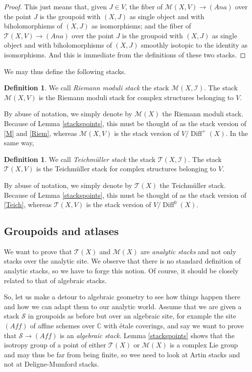 \documentclass[10pt]{amsart}
\let\mathcal\mathscr
\newcommand{\Aff}{\mathit{Aff}}
\newcommand{\Ana}{\mathit{Ana}}
\DeclareMathOperator{\Diff}{Diff}
\theoremstyle{plain}
\theoremstyle{definition}
\newtheorem{definition}[theorem]{Definition}
\theoremstyle{remark}
\numberwithin{equation}{section}
\newcommand{\CC}{{\mathbb{C}}}
\newcommand{\T}{\mathcal T(X)}
\newcommand{\cI}{\mathcal{I}}
\begin{document}
\begin{proof}
This just means that, given $J\in V$, the fiber of $\mathcal M(X,V)\to(\Ana)$ over the point $J$ is the groupoid with $(X,J)$ as single object and with biholomorphisms of $(X,J)$ as isomorphisms; and the fiber of $\mathcal T(X,V)\to(\Ana)$ over the point $J$ is the groupoid with $(X,J)$ as single object and with biholomorphisms of $(X,J)$ smoothly isotopic to the identity as isomorphisms. And this is immediate from the definitions of these two stacks.
\end{proof}
We may thus define the following stacks.
\begin{definition}
\label{RMS}
We call \emph{Riemann moduli stack} the stack $\mathcal M(X,\cI)$. The stack $\mathcal M(X, V)$ is the Riemann moduli stack for complex structures belonging to $V$.
\end{definition}

By abuse of notation, we simply denote by $\mathcal M(X)$ the Riemann moduli stack. Because of Lemma \ref{stackspoints}, this must be thought of as the stack version of \eqref{M} and \eqref{Riem}, whereas $\mathcal M(X, V)$ is the stack version of $V/\Diff^+(X)$. In the same way,

\begin{definition}
\label{TMS}
We call \emph{Teichmüller stack} the stack $\mathcal T(X,\cI)$. The stack $\mathcal T(X, V)$ is the Teichmüller stack for complex structures belonging to $V$.
\end{definition}

By abuse of notation, we simply denote by $\mathcal T(X)$ the Teichmüller stack. Because of Lemma \ref{stackspoints}, this must be thought of as the stack version of \eqref{Teich}, whereas $\mathcal T(X, V)$ is the stack version of $V/\Diff^0(X)$.

\subsection{Groupoids and atlases}
\label{groupoidatlas}
We want to prove that $\T$ and $\mathcal M(X)$ are \emph{analytic stacks} and not only stacks over the analytic site. We observe that there is no standard definition of analytic stacks, so we have to forge this notion. Of course, it should be closely related to that of algebraic stacks.

So, let us make a detour to algebraic geometry to see how things happen there and how we can adapt them to our analytic world. Assume that we are given a stack $\mathcal S$ in groupoids as before but over an algebraic site, for example the site $(\Aff)$ of affine schemes over $\CC$ with étale coverings, and say we want to
prove that $\mathcal S\to (\Aff)$ is an \emph{algebraic stack}. Lemma \ref{stackspoints} shows that the isotropy group of a point of either $\T$ or $\mathcal M(X)$ is a complex Lie group and may thus be far from being finite, so wee need to look at Artin stacks and not at Deligne-Mumford stacks.
\end{document}
